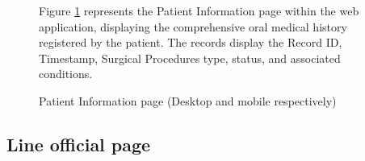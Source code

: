 \documentclass[12pt,oneside,openright,a4paper]{cpe-english-project}
\begin{document}
\begin{figure}[!h]
\begin{minipage}{.25\textwidth}
      \end{minipage}
      \caption{Patient Information page (Desktop and mobile respectively)}\label{fig:Patient_Information_page}
      \begin{justify}
        \qquad Figure \ref{fig:Patient_Information_page} represents the Patient Information page within the web application, displaying the comprehensive oral medical history registered by the patient. The records display the Record ID, Timestamp, Surgical Procedures type, status, and associated conditions. \par
      \end{justify}
    \end{figure}
    \subsection{Line official page}
\end{document}
